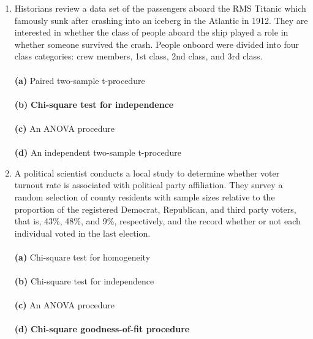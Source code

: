 \documentclass[12pt]{article}
\begin{document}
\begin{enumerate}[leftmargin=\labelsep]
\item  Historians review a data set of the passengers aboard the RMS Titanic which famously sunk after crashing into an iceberg in the Atlantic in 1912. They are interested in whether the class of people aboard the ship played a role in whether someone survived the crash. People onboard were divided into four class categories: crew members, 1st class, 2nd class, and 3rd class.\\ \vspace{1mm}\\
{\bf (a)} \hspace{2mm} Paired two-sample t-procedure\\ \vspace{1mm}\\
{\bf (b)} \hspace{2mm} {\bf Chi-square test for independence}\\   \vspace{1mm}\\
{\bf (c)} \hspace{2mm} An ANOVA procedure\\  \vspace{1mm}\\
{\bf (d)} \hspace{2mm} An independent two-sample t-procedure\\

\item A political scientist conducts a local study to determine whether voter turnout rate is associated with political party affiliation. They survey a random selection of county residents with sample sizes relative to the proportion of the registered Democrat, Republican, and third party voters, that is, 43\%, 48\%, and 9\%, respectively, and the record whether or not each individual voted in the last election.\\ \vspace{1mm}\\
{\bf (a)} \hspace{2mm} Chi-square test for homogeneity\\ \vspace{1mm}\\
{\bf (b)} \hspace{2mm} Chi-square test for independence\\   \vspace{1mm}\\
{\bf (c)} \hspace{2mm} An ANOVA procedure\\  \vspace{1mm}\\
{\bf (d)} \hspace{2mm} {\bf Chi-square goodness-of-fit procedure}\\


\end{enumerate}
\end{document}
